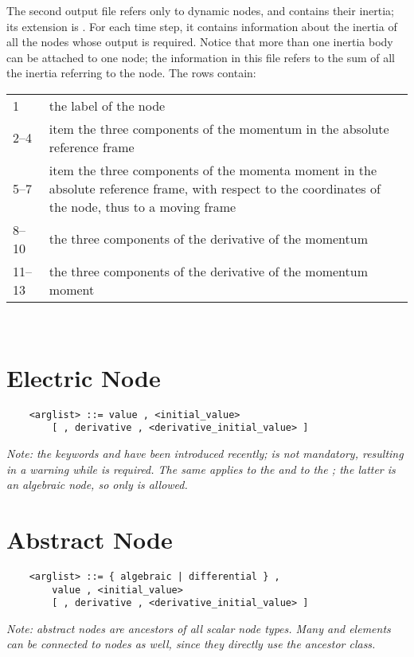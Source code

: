 \noindent
The second output file refers only to dynamic nodes, and contains their
inertia; its extension is .
For each time step, it contains information about the inertia of all the
nodes whose output is required.
Notice that more than one inertia body can be attached to one node; the
information in this file refers to the sum of all the inertia referring to
the node.
The rows contain: \vspace{2mm} \\
\begin{tabular}{lp{140mm}}
        \hline
	1	& the label of the node \\
	2--4	& item the three components of the momentum
		in the absolute reference frame \\
	5--7	& item the three components of the momenta moment
		in the absolute reference frame,
		with respect to the coordinates of the node, 
		thus to a moving frame \\
    	8--10	& the three components of the derivative of the momentum \\
    	11--13	& the three components of the derivative of the momentum moment \\
	\hline
\end{tabular}\vspace{2mm}\\


\section{Electric Node}
\begin{verbatim}
    <arglist> ::= value , <initial_value> 
        [ , derivative , <derivative_initial_value> ]
\end{verbatim}
\emph{Note: the keywords  and 
have been introduced recently;  is not mandatory,
resulting in a warning while  is required.
The same applies to the  
and to the ; the latter is an algebraic
node, so only  is allowed.
}





\section{Abstract Node}
\begin{verbatim}
    <arglist> ::= { algebraic | differential } ,
        value , <initial_value>
        [ , derivative , <derivative_initial_value> ]
\end{verbatim}
\emph{
	Note: abstract nodes are ancestors of all scalar node types.
	Many  and  elements can be connected
	to  nodes as well, since they directly use
	the ancestor class. 
}

